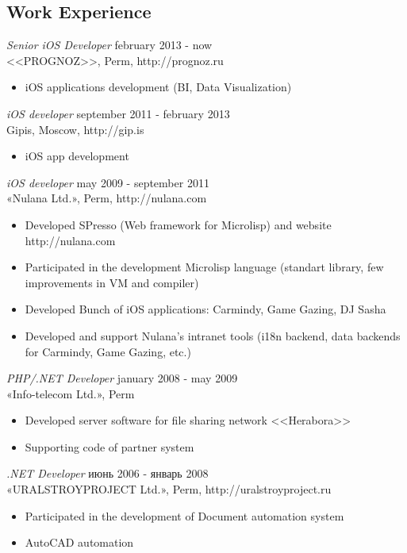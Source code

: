 \documentclass[13pt]{res}
\begin{document}
\begin{resume}
\section{Work Experience}

{\sl Senior iOS Developer} \hfill february 2013 - now \\
<<PROGNOZ>>, Perm, http://prognoz.ru 
\begin{itemize} 
\item iOS applications development (BI, Data Visualization)
\end{itemize}

{\sl iOS developer} \hfill september 2011 - february 2013 \\
Gipis, Moscow, http://gip.is 
\begin{itemize} 
\item iOS app development
\end{itemize}

{\sl iOS developer} \hfill may 2009 - september 2011 \\
«Nulana Ltd.», Perm, http://nulana.com
\begin{itemize} 
\item Developed SPresso (Web framework for Microlisp) and website http://nulana.com
\item Participated in the development Microlisp language (standart library, few improvements in VM and compiler)
\item Developed Bunch of iOS applications: Carmindy, Game Gazing, DJ Sasha
\item Developed and support Nulana's intranet tools (i18n backend, data backends for Carmindy, Game Gazing, etc.)
\end{itemize} 
\newpage
{\sl PHP/.NET Developer} \hfill january 2008 - may 2009 \\
«Info-telecom Ltd.», Perm
\begin{itemize}
\item Developed server software for file sharing network <<Herabora>>
\item Supporting code of partner system
\end{itemize} 

{\sl .NET Developer} \hfill июнь 2006 - январь 2008 \\
«URALSTROYPROJECT Ltd.», Perm, http://uralstroyproject.ru
\begin{itemize}
\item Participated in the development of Document automation system
\item AutoCAD automation
\end{itemize} 


\end{resume}
\end{document}
